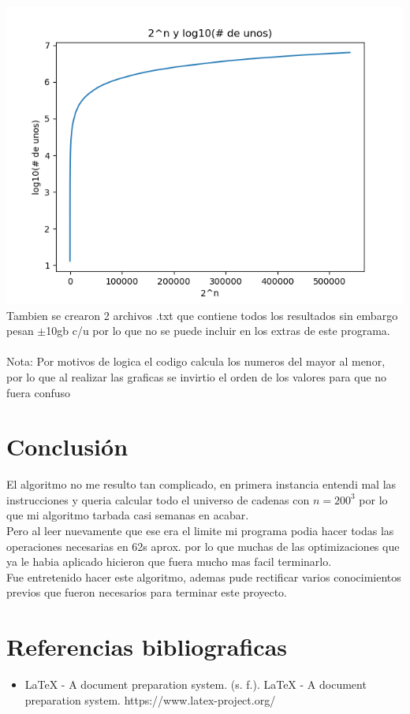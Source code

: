 \documentclass{article}
\begin{document}
\includegraphics{Graph4.png}
Tambien se crearon 2 archivos .txt que contiene todos los resultados sin embargo pesan $\pm$10gb c/u por lo que no se puede incluir en los extras de este programa.\\
\\Nota: Por motivos de logica el codigo calcula los numeros del mayor al menor, por lo que al realizar las graficas se invirtio el orden de los valores para que no fuera confuso

\section{Conclusión}
El algoritmo no me resulto tan complicado, en primera instancia entendi mal las instrucciones y queria calcular todo el universo de cadenas con $n = 200^3$ por lo que mi algoritmo tarbada casi semanas en acabar.
\\Pero al leer nuevamente que ese era el limite mi programa podia hacer todas las operaciones necesarias en 62s aprox. por lo que muchas de las optimizaciones que ya le habia aplicado hicieron que fuera mucho mas facil terminarlo.
\\Fue entretenido hacer este algoritmo, ademas pude rectificar varios conocimientos previos que fueron necesarios para terminar este proyecto.

\section{Referencias bibliograficas}
\begin{itemize}
    \item LaTeX - A document preparation system. (s. f.). LaTeX - A document preparation system. https://www.latex-project.org/
\end{itemize}
\end{document}
